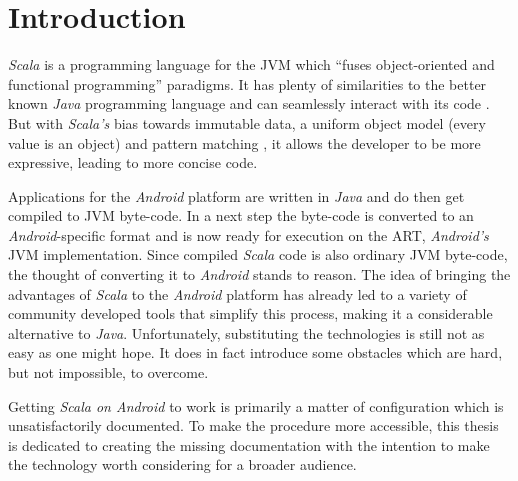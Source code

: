 \section{Introduction}

\textit{Scala} is a programming language for the \acf{JVM} which \enquote{fuses object-oriented and functional programming} \cite[p. 1]{odersky04} paradigms. It has plenty of similarities to the better known \textit{Java} programming language and can seamlessly interact with its code \cite[p. 2]{odersky04}. But with \textit{Scala's} bias towards immutable data, a uniform object model (every value is an object) \cite[p. 3]{odersky04} and pattern matching \cite[p. 13]{odersky04}, it allows the developer to be more expressive, leading to more concise code.

Applications for the \textit{Android} platform are written in \textit{Java} and do then get compiled to \ac{JVM} byte-code. In a next step the byte-code is converted to an \textit{Android}-specific format and is now ready for execution on the \acf{ART}, \textit{Android's} \ac{JVM} implementation. Since compiled \textit{Scala} code is also ordinary \ac{JVM} byte-code, the thought of converting it to \textit{Android} stands to reason. The idea of bringing the advantages of \textit{Scala} to the \textit{Android} platform has already led to a variety of community developed tools that simplify this process, making it a considerable alternative to \textit{Java}. Unfortunately, substituting the technologies is still not as easy as one might hope. It does in fact introduce some obstacles which are hard, but not impossible, to overcome.

Getting \textit{Scala on Android} to work is primarily a matter of configuration which is unsatisfactorily documented. To make the procedure more accessible, this thesis is dedicated to creating the missing documentation with the intention to make the technology worth considering for a broader audience.